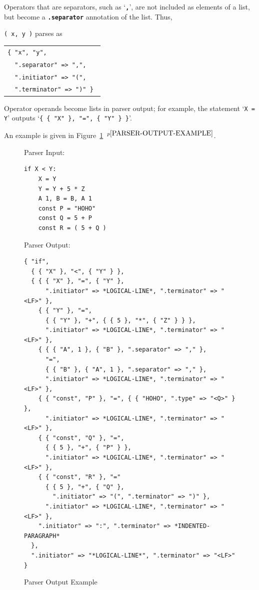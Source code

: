 \documentclass[12pt]{article}
\newcommand{\TT}[1]{{\tt \bfseries #1}}
\newcommand{\ttkey}[1]{{\tt \bfseries #1}}
\newcommand{\pagnote}[1]{$\,^{p\pageref{#1}}$}
\newlength{\figurewidth}
\newenvironment{boxedfigure}[1][!btp]%
	{\begin{figure}[#1]
	 \begin{lrbox}{\figurebox}
	 \begin{minipage}{\figurewidth}

	 \vspace*{1ex}}%
	{
	 \vspace*{1ex}

	 \end{minipage}
	 \end{lrbox}

	 \centering
	 \fbox{\hspace*{0.1in}\usebox{\figurebox}\hspace*{0.1in}}
	 \end{figure}}
\newenvironment{indpar}[1][0.3in]%
	{\begin{list}{}%
		     {\setlength{\itemsep}{0in}%
		      \setlength{\topsep}{0in}%
		      \setlength{\parsep}{1ex}%
		      \setlength{\labelwidth}{#1}%
		      \setlength{\leftmargin}{#1}%
		      \addtolength{\leftmargin}{\labelsep}}%
	 \item}%
	{\end{list}}
\begin{document}
Operators that are separators, such as `\TT{,}', are not included as elements
of a list, but become a \ttkey{.separator} annotation of the list.  Thus,
\begin{indpar}
{\tt ( x, y )} parses as \begin{tabular}[t]{@{}l@{}}
                \tt \{ "x", "y", \\
		\tt ~~".separator" => ",", \\
		\tt ~~".initiator" => "(", \\
		\tt ~~".terminator" => ")" \} \\
                \end{tabular}
\end{indpar}

Operator operands become lists in parser output;
for example, the statement `{\tt X = Y}' outputs
`{\tt \{ \{ "X" \}, "=", \{ "Y" \} \}}'.

An example is given in Figure~\ref{PARSER-OUTPUT-EXAMPLE}%
\pagnote{PARSER-OUTPUT-EXAMPLE}.

\begin{boxedfigure}[!p]
\begin{indpar}[1em]


Parser Input:
\begin{indpar}[1em]\begin{verbatim}
if X < Y:
    X = Y
    Y = Y + 5 * Z
    A 1, B = B, A 1
    const P = "HOHO"
    const Q = 5 + P
    const R = ( 5 + Q )
\end{verbatim}\end{indpar}

\medskip

Parser Output:
\begin{indpar}[1em]\begin{verbatim}
{ "if",
  { { "X" }, "<", { "Y" } },
  { { { "X" }, "=", { "Y" },
      ".initiator" => *LOGICAL-LINE*, ".terminator" => "<LF>" },
    { { "Y" }, "=",
      { { "Y" }, "+", { { 5 }, "*", { "Z" } } },
      ".initiator" => *LOGICAL-LINE*, ".terminator" => "<LF>" },
    { { { "A", 1 }, { "B" }, ".separator" => "," },
      "=",
      { { "B" }, { "A", 1 }, ".separator" => "," },
      ".initiator" => *LOGICAL-LINE*, ".terminator" => "<LF>" },
    { { "const", "P" }, "=", { { "HOHO", ".type" => "<Q>" } },
      ".initiator" => *LOGICAL-LINE*, ".terminator" => "<LF>" },
    { { "const", "Q" }, "=",
      { { 5 }, "+", { "P" } },
      ".initiator" => *LOGICAL-LINE*, ".terminator" => "<LF>" },
    { { "const", "R" }, "="
      { { 5 }, "+", { "Q" },
        ".initiator" => "(", ".terminator" => ")" },
      ".initiator" => *LOGICAL-LINE*, ".terminator" => "<LF>" },
    ".initiator" => ":", ".terminator" => *INDENTED-PARAGRAPH*
  },
  ".initiator" => "*LOGICAL-LINE*", ".terminator" => "<LF>"
}

\end{verbatim}\end{indpar}
\end{indpar}

\caption{Parser Output Example}
\label{PARSER-OUTPUT-EXAMPLE}
\end{boxedfigure}
\end{document}
